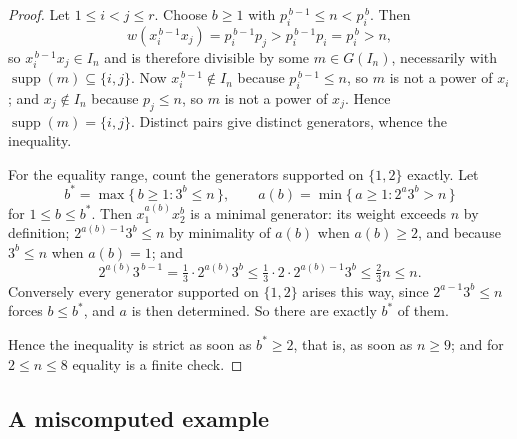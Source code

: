 \documentclass[a4paper,11pt,oneside,reqno]{amsart}
\theoremstyle{definition}
\theoremstyle{remark}
\theoremstyle{plain}
\begin{document}
\begin{proof}
  Let \(1 \le i < j \le r\). Choose \(b \ge 1\) with \(p_i^{\,b-1} \le n < p_i^{\,b}\).
  Then
  \[
    w(x_i^{\,b-1}x_j) = p_i^{\,b-1}p_j > p_i^{\,b-1}p_i = p_i^{\,b} > n,
  \]
  so \(x_i^{\,b-1}x_j \in I_n\) and is therefore divisible by some
  \(m \in G(I_n)\), necessarily with \(\operatorname{supp}(m) \subseteq \{i,j\}\).
  Now \(x_i^{\,b-1} \notin I_n\) because \(p_i^{\,b-1} \le n\), so \(m\) is not a
  power of \(x_i\); and \(x_j \notin I_n\) because \(p_j \le n\), so \(m\) is not
  a power of \(x_j\). Hence \(\operatorname{supp}(m) = \{i,j\}\). Distinct pairs
  give distinct generators, whence the inequality.

  For the equality range, count the generators supported on \(\{1,2\}\)
  exactly. Let
  \[
    b^{*} = \max\{\,b \ge 1 : 3^{b} \le n\,\},\qquad
    a(b) = \min\{\,a \ge 1 : 2^{a}3^{b} > n\,\}
  \]
  for \(1 \le b \le b^{*}\). Then
  \(x_1^{a(b)}x_2^{b}\) is a minimal generator: its weight exceeds \(n\) by
  definition; \(2^{a(b)-1}3^{b} \le n\) by minimality of \(a(b)\) when
  \(a(b) \ge 2\), and because \(3^{b} \le n\) when \(a(b) = 1\); and
  \[
    2^{a(b)}3^{\,b-1} = \tfrac{1}{3} \cdot 2^{a(b)}3^{b}
      \le \tfrac{1}{3} \cdot 2 \cdot 2^{a(b)-1}3^{b} \le \tfrac{2}{3}n \le n .
  \]
  Conversely every generator supported on \(\{1,2\}\) arises this way, since
  \(2^{a-1}3^{b} \le n\) forces \(b \le b^{*}\), and \(a\) is then determined.
  So there are exactly \(b^{*}\) of them.

  Hence the inequality is strict as soon as \(b^{*} \ge 2\), that is, as soon as
  \(n \ge 9\); and for \(2 \le n \le 8\) equality is a finite check.
\end{proof}

\subsection{A miscomputed example}
\end{document}
